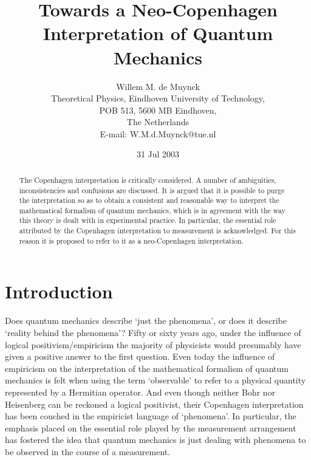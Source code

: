 \documentclass[12pt]{article}
\begin{document}
\title{\Large Towards a Neo-Copenhagen Interpretation of Quantum Mechanics}

\author{\normalsize Willem M. de Muynck\\
\normalsize Theoretical Physics, Eindhoven University of Technology,\\ 
\normalsize POB 513, 5600 MB Eindhoven,\\
\normalsize The Netherlands \\
\normalsize E-mail: W.M.d.Muynck@tue.nl\\}

\date{\normalsize 31 Jul 2003}


\maketitle

\begin{abstract}
 The Copenhagen interpretation is critically considered.
A number of ambiguities, inconsistencies and confusions are
discussed. It is argued that it is possible to purge the
interpretation so as to obtain a consistent and reasonable way to
interpret the mathematical formalism of quantum mechanics, which
is in agreement with the way this theory is dealt with in
experimental practice. In particular, the essential role
attributed by the Copenhagen interpretation to measurement is
acknowledged. For this reason it is proposed to refer to it as a
neo-Copenhagen interpretation.
\end{abstract}


\newpage

\section{Introduction}\label{sec1}
Does quantum mechanics describe `just the phenomena', or does it
describe `reality behind the phenomena'? Fifty or sixty years ago,
under the influence of logical positivism/empiricism the majority
of physicists would presumably have given a positive answer to the
first question. Even today the influence of empiricism on the
interpretation of the mathematical formalism of quantum mechanics
is felt when using the term `observable' to refer to a physical
quantity represented by a Hermitian operator. And even though
neither Bohr nor Heisenberg can be reckoned a logical positivist,
their Copenhagen interpretation has been couched in the empiricist
language of `phenomena'. In particular, the emphasis placed on the
essential role played by the measurement arrangement has fostered
the idea that quantum mechanics is just dealing with phenomena to
be observed in the course of a measurement.
\end{document}
